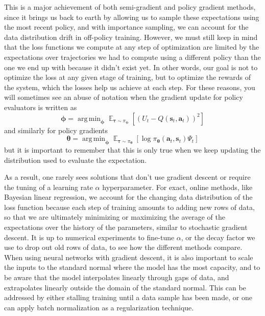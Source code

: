 \documentclass{article}
\DeclareMathOperator*{\argmin}{arg\,min}
\begin{document}
This is a major achievement of both semi-gradient and policy gradient methods, since it brings us back to earth by allowing us to sample these expectations using the most recent policy, and with importance sampling, we can account for the data distribution drift in off-policy training. However, we must still keep in mind that the loss functions we compute at any step of optimization are limited by the expectations over trajectories we had to compute using a different policy than the one we end up with because it didn't exist yet. In other words, our goal is not to optimize the loss at any given stage of training, but to optimize the rewards of the system, which the losses help us achieve at each step. For these reasons, you will sometimes see an abuse of notation when the gradient update for policy evaluators is written as \begin{equation}\boldsymbol{\phi}=\argmin_{\boldsymbol{\phi}}\mathop{\mathbb{E}}_{\boldsymbol{\tau}\sim\pi_{\boldsymbol{\phi}}}\left[\left(U_t-Q(\mathbf{s}_t,\mathbf{a}_t)\right)^2\right]\end{equation} and similarly for policy gradients \begin{equation}\boldsymbol{\theta}=\argmin_{\boldsymbol{\phi}}\mathop{\mathbb{E}}_{\boldsymbol{\tau}\sim\pi_{\boldsymbol{\theta}}}\left[\log\pi_{\boldsymbol{\theta}}(\mathbf{a}_t,\mathbf{s}_t)\Psi_t\right]\end{equation}but it is important to remember that this is only true when we keep updating the distribution used to evaluate the expectation.

As a result, one rarely sees solutions that don't use gradient descent or require the tuning of a learning rate $\alpha$ hyperparameter. For exact, online methods, like Bayesian linear regression, we account for the changing data distribution of the loss function because each step of training amounts to adding new rows of data, so that we are ultimately minimizing or maximizing the average of the expectations over the history of the parameters, similar to stochastic gradient descent. It is up to numerical experiments to fine-tune $\alpha$, or the decay factor we use to drop out old rows of data, to see how the different methods compare. When using neural networks with gradient descent, it is also important to scale the inputs to the standard normal where the model has the most capacity, and to be aware that the model interpolates linearly through gaps of data, and extrapolates linearly outside the domain of the standard normal. This can be addressed by either stalling training until a data sample has been made, or one can apply batch normalization\cite{batch_normalization} as a regularization technique.
\end{document}
